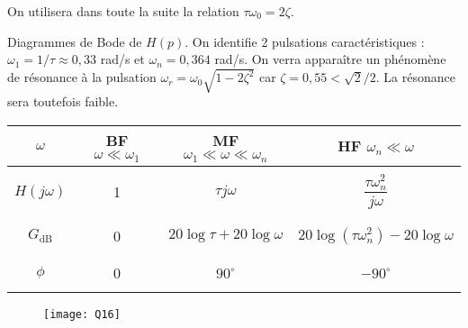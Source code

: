 \begin{multicols}{2}
On utilisera dans toute la suite la relation $\tau \omega_0= 2\zeta$.\\

%




\ifprof
\begin{corrige}
 Diagrammes de Bode de $H(p)$. On identifie 2 pulsations caractéristiques : $\omega_1=1/\tau\approx 0,33$ rad/s et $\omega_n=0,364$ rad/s. On verra apparaître un phénomène de résonance \`a la pulsation $\omega_r=\omega_0\sqrt{1-2\zeta^2}$ car $\zeta=0,55<\sqrt{2}/2$. La résonance sera toutefois faible.

\begin{table}[H]
\begin{center}
\begin{tabular}{|c|c|c|c|}
\hline
$\omega$ & BF $\omega \ll \omega_1$ & MF $\omega_1 \ll \omega \ll \omega_n$& HF $\omega_n \ll \omega$ \\
\hline
\hline
&&&\\
$H(j\omega)$ & 1 & $\tau j \omega$ & $\dfrac{\tau\omega_n^2}{j\omega}$\\
&&&\\
\hline
&&&\\
$G_{\text{dB}}$ & 0 & $20\log\tau+20\log\omega$ & $20\log(\tau \omega_n^2)-20\log\omega$\\
&&&\\
\hline
&&&\\
$\phi$ &0 & $90^\circ$ & $-90^\circ$ \\
&&&\\
\hline
\end{tabular}
\end{center}
\end{table}



\begin{figure}[H]
\centering
\texttt{[image: Q16]}
\end{figure}



\end{corrige}
\end{multicols}
